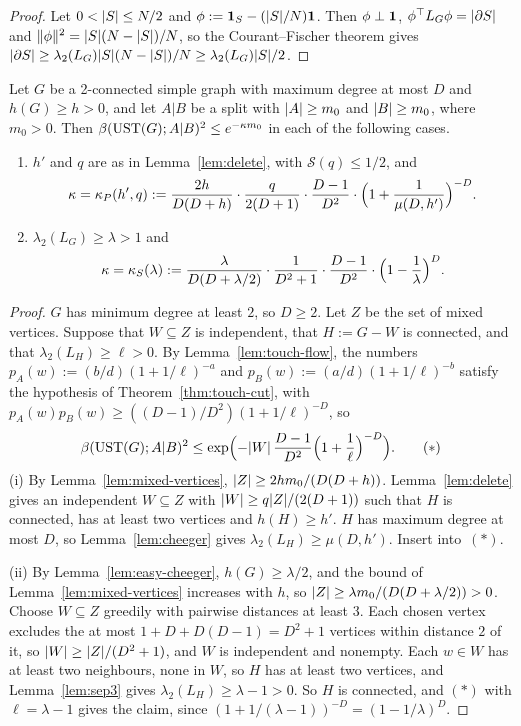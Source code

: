 \begin{proof}
Let $0<\lvert S\rvert\le N/2$ and $\phi:=\mathbf{1}_S-(\lvert S\rvert/N)\mathbf{1}$. Then $\phi\perp\mathbf{1}$, $\phi^{\top}L_G\phi=\lvert \partial S\rvert$ and $\lVert \phi\rVert^2=\lvert S\rvert(N-\lvert S\rvert)/N$, so the Courant--Fischer theorem gives $\lvert \partial S\rvert\ge\lambda_2(L_G)\lvert S\rvert(N-\lvert S\rvert)/N\ge\lambda_2(L_G)\lvert S\rvert/2$.
\end{proof}

\begin{proposition}\label{prop:touch-param}
Let $G$ be a 2-connected simple graph with maximum degree at most $D$ and $h(G)\ge h>0$, and let $A|B$ be a split with $\lvert A\rvert\ge m_0$ and $\lvert B\rvert\ge m_0$, where $m_0>0$. Then $\beta(\mathrm{UST}(G);A|B)^2\le e^{-\kappa m_0}$ in each of the following cases.
\begin{enumerate}[label=(\roman*)]
\item $h'$ and $q$ are as in Lemma~\ref{lem:delete}, with $\mathcal S(q)\le1/2$, and
\[
  \kappa=\kappa_P(h',q):=\frac{2h}{D(D+h)}\cdot\frac q{2(D+1)}\cdot\frac{D-1}{D^2}\cdot\Bigl(1+\frac1{\mu(D,h')}\Bigr)^{-D}.
\]
\item $\lambda_2(L_G)\ge\lambda>1$ and
\[
  \kappa=\kappa_S(\lambda):=\frac{\lambda}{D(D+\lambda/2)}\cdot\frac1{D^2+1}\cdot\frac{D-1}{D^2}\cdot\Bigl(1-\frac1\lambda\Bigr)^{D}.
\]
\end{enumerate}
\end{proposition}

\begin{proof}
$G$ has minimum degree at least $2$, so $D\ge2$. Let $Z$ be the set of mixed vertices. Suppose that $W\subseteq Z$ is independent, that $H:=G-W$ is connected, and that $\lambda_2(L_H)\ge\ell>0$. By Lemma~\ref{lem:touch-flow}, the numbers $p_A(w):=(b/d)(1+1/\ell)^{-a}$ and $p_B(w):=(a/d)(1+1/\ell)^{-b}$ satisfy the hypothesis of Theorem~\ref{thm:touch-cut}, with $p_A(w)p_B(w)\ge((D-1)/D^2)(1+1/\ell)^{-D}$, so
\[
  \beta(\mathrm{UST}(G);A|B)^2\le\exp\Bigl(-\lvert W\rvert\,\frac{D-1}{D^2}\Bigl(1+\frac1\ell\Bigr)^{-D}\Bigr).\tag{$*$}
\]
(i) By Lemma~\ref{lem:mixed-vertices}, $\lvert Z\rvert\ge2hm_0/(D(D+h))$. Lemma~\ref{lem:delete} gives an independent $W\subseteq Z$ with $\lvert W\rvert\ge q\lvert Z\rvert/(2(D+1))$ such that $H$ is connected, has at least two vertices and $h(H)\ge h'$. $H$ has maximum degree at most $D$, so Lemma~\ref{lem:cheeger} gives $\lambda_2(L_H)\ge\mu(D,h')$. Insert into~$(*)$.

(ii) By Lemma~\ref{lem:easy-cheeger}, $h(G)\ge\lambda/2$, and the bound of Lemma~\ref{lem:mixed-vertices} increases with $h$, so $\lvert Z\rvert\ge\lambda m_0/(D(D+\lambda/2))>0$. Choose $W\subseteq Z$ greedily with pairwise distances at least $3$. Each chosen vertex excludes the at most $1+D+D(D-1)=D^2+1$ vertices within distance $2$ of it, so $\lvert W\rvert\ge\lvert Z\rvert/(D^2+1)$, and $W$ is independent and nonempty. Each $w\in W$ has at least two neighbours, none in $W$, so $H$ has at least two vertices, and Lemma~\ref{lem:sep3} gives $\lambda_2(L_H)\ge\lambda-1>0$. So $H$ is connected, and $(*)$ with $\ell=\lambda-1$ gives the claim, since $(1+1/(\lambda-1))^{-D}=(1-1/\lambda)^D$.
\end{proof}

